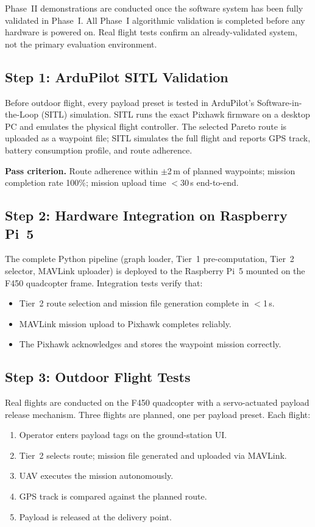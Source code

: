 Phase~II demonstrations are conducted once the software system has been fully validated in Phase~I. 
All Phase~I algorithmic validation is completed before any hardware is powered on. 
Real flight tests confirm an already-validated system, not the primary evaluation environment.

\subsection{Step 1: ArduPilot SITL Validation}

Before outdoor flight, every payload preset is tested in ArduPilot's
Software-in-the-Loop (SITL) simulation. SITL runs the exact Pixhawk firmware on a
desktop PC and emulates the physical flight controller. The selected Pareto route is
uploaded as a waypoint file; SITL simulates the full flight and reports GPS track,
battery consumption profile, and route adherence.

\textbf{Pass criterion.} Route adherence within $\pm$2\,m of planned waypoints; mission
completion rate 100\%; mission upload time $<$30\,s end-to-end.

\subsection{Step 2: Hardware Integration on Raspberry Pi~5}

The complete Python pipeline (graph loader, Tier~1 pre-computation, Tier~2 selector,
MAVLink uploader) is deployed to the Raspberry Pi~5 mounted on the F450 quadcopter
frame. Integration tests verify that:
\begin{itemize}
  \item Tier~2 route selection and mission file generation complete in $<$1\,s.
  \item MAVLink mission upload to Pixhawk completes reliably.
  \item The Pixhawk acknowledges and stores the waypoint mission correctly.
\end{itemize}

\subsection{Step 3: Outdoor Flight Tests}

Real flights are conducted on the F450 quadcopter with a servo-actuated payload release
mechanism. Three flights are planned, one per payload preset. Each flight:
\begin{enumerate}
  \item Operator enters payload tags on the ground-station UI.
  \item Tier~2 selects route; mission file generated and uploaded via MAVLink.
  \item UAV executes the mission autonomously.
  \item GPS track is compared against the planned route.
  \item Payload is released at the delivery point.
\end{enumerate}

